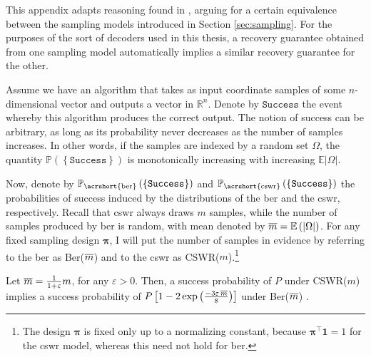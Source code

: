 This appendix adapts reasoning found in \cite[Appendix]{candes2011a}, arguing for a certain equivalence between the sampling models introduced in Section \ref{sec:sampling}. For the purposes of the sort of decoders used in this thesis, a recovery guarantee obtained from one sampling model automatically implies a similar recovery guarantee for the other.

Assume we have an algorithm that takes as input coordinate samples of some $n$-dimensional vector and outputs a vector in $\mathbb{R}^{n}$. Denote by $\texttt{Success}$ the event whereby this algorithm produces the correct output. The notion of success can be arbitrary, as long as its probability never decreases as the number of samples increases. In other words, if the samples are indexed by a random set $\Omega$, the quantity $\mathbb{P} \left ( \left \{ \texttt{Success} \right \}\right )$ is monotonically increasing with increasing $\mathbb{E} |\Omega|$.

Now, denote by $\mathbb{P}_{\text{\acrshort{ber}}} \left ( \left \{  \texttt{Success} \right \}\right )$ and $\mathbb{P}_{\text{\acrshort{cswr}}} \left ( \left \{  \texttt{Success} \right \}\right )$ the probabilities of success induced by the distributions of the \acrfull{ber} and the \acrfull{cswr}, respectively. Recall that \acrshort{cswr} always draws $m$ samples, while the number of samples produced by \acrshort{ber} is random, with mean denoted by $\mathop{\overline{m}} = \mathbb{E} \left ( |\Omega| \right )$. For any fixed sampling design $\bm{\pi}$, I will put the number of samples in evidence by referring to the \acrlong{ber} as Ber($\mathop{\overline{m}}$) and to the \acrlong{cswr} as CSWR($m$).\footnote{The design $\bm{\pi}$ is fixed only up to a normalizing constant, because $\bm{\pi}^\top \mathbf{1} = 1$ for the \acrshort{cswr} model, whereas this need not hold for \acrshort{ber}.}

\begin{lemma}
    Let $\mathop{\overline{m}} = \frac{1}{1 + \varepsilon} m$, for any $\varepsilon > 0$. Then, a success probability of $P$ under CSWR($m$) implies a success probability of $P \left [ 1 - 2 \exp \left ( \frac{-3 \varepsilon \mathop{\overline{m}}}{8} \right ) \right ]$ under Ber($\mathop{\overline{m}}$) .
\end{lemma}

